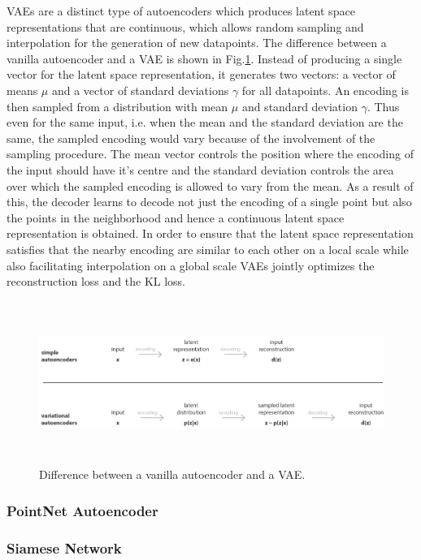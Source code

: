 {\ac{VAE}s are a distinct type of autoencoders which produces latent space representations that are continuous, which allows random sampling and interpolation for the generation of new datapoints. The difference between a vanilla autoencoder and a \ac*{VAE} is shown in Fig.\ref*{fig:vae}. Instead of producing a single vector for the latent space representation, it generates two vectors: a vector of means $\mu$ and a vector of standard deviations $\gamma$ for all datapoints. An encoding is then sampled from a distribution with mean $\mu$ and standard deviation $\gamma$. Thus even for the same input, i.e. when the mean and the standard deviation are the same, the sampled encoding would vary because of the involvement of the sampling procedure. The mean vector controls the position where the encoding of the input should have it's centre and the standard deviation controls the area over which the sampled encoding is allowed to vary from the mean. As a result of this, the decoder learns to decode not just the encoding of a single point but also the points in the neighborhood and hence a continuous latent space representation is obtained. In order to ensure that the latent space representation satisfies that the nearby encoding are similar to each other on a local scale while also facilitating interpolation on a global scale \ac{VAE}s jointly optimizes the reconstruction loss and the \ac*{KL}\cite*{kullback1951information} loss.\cite*{kingma2019introduction,vae}
\begin{figure}[t]
    \centering
    \includegraphics[width=400pt,height=150pt]{pictures/vae.png}
    \caption{Difference between a vanilla autoencoder and a \ac{VAE}.\cite{vae_image}}
    \label{fig:vae}
\end{figure} 
\subsubsection{PointNet Autoencoder}
\subsubsection{Siamese Network}
}
